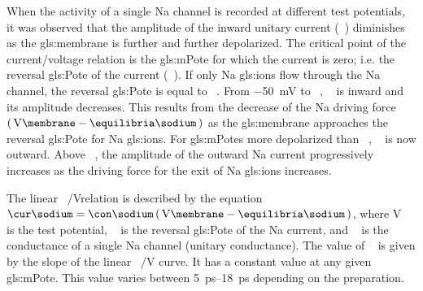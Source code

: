 \documentclass[../../Orator]{subfiles}
\begin{document}
When the activity of a single \gls{Na} channel is  recorded at different test potentials, it was observed that the amplitude of the inward unitary current (\unit{\cur\sodium}) diminishes as the \gls{gls:membrane} is further and further depolarized. The critical point of the current/voltage relation is the \gls{gls:mPote} for which the current is zero; i.e. the reversal \gls{gls:Pote} of the current (\unit{\equilibria\reverse}). If only \gls{Na} \glspl{gls:ion} flow through the \gls{Na} channel, the reversal \gls{gls:Pote} is equal to \unit{\equilibria\sodium}. From \qty{-50}{\mV} to \unit{\equilibria\reverse}, \unit{\cur\sodium} is inward and its amplitude decreases. This results from the decrease of the \gls{Na} driving force \(\br{\unit{\V\membrane}-\unit{\equilibria\sodium}}\) as the \gls{gls:membrane} approaches the reversal \gls{gls:Pote} for \gls{Na} \glspl{gls:ion}. For \glspl{gls:mPote} more depolarized than \unit{\equilibria\reverse}, \unit{\cur\sodium} is now outward. Above \unit{\equilibria\reverse}, the amplitude of the outward \gls{Na} current progressively increases as the driving force for the exit of \gls{Na} \glspl{gls:ion} increases. 

The linear \unit[per-mode = symbol]{\cur\sodium\per\V}relation is described by the equation \(\unit{\cur\sodium} = \unit{\con\sodium} \br{\unit{\V\membrane}-\unit{\equilibria\sodium}}\), where \unit{\V\membrane} is the test potential, \unit{\equilibria\sodium} is the reversal \gls{gls:Pote} of the \gls{Na} current, and \unit{\con\sodium} is the conductance of a single \gls{Na} channel (unitary conductance). The value of \unit{\con\sodium} is given by the slope of the linear \unit[per-mode = symbol]{\cur\sodium\per\V} curve. It has a constant value at any given \gls{gls:mPote}. This value varies between \qtyrange{5}{18}{\pico\second} depending on the preparation.
\end{document}
